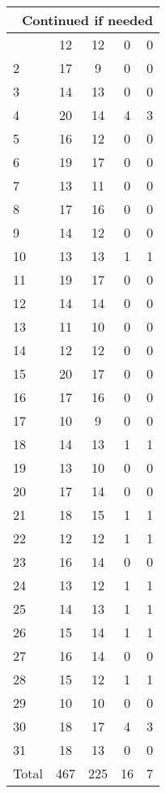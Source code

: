\begin{center}
\begin{longtable}{l|c|c|c|c}
\hline \multicolumn{5}{|r|}{{Continued if needed}} \\ \hline
\endfoot 
1 & 12 & 12 & 0 & 0\\ \hline
2 & 17 & 9 & 0 & 0\\ \hline
3 & 14 & 13 & 0 & 0\\ \hline
4 & 20 & 14 & 4 & 3\\ \hline
5 & 16 & 12 & 0 & 0\\ \hline
6 & 19 & 17 & 0 & 0\\ \hline
7 & 13 & 11 & 0 & 0\\ \hline
8 & 17 & 16 & 0 & 0\\ \hline
9 & 14 & 12 & 0 & 0\\ \hline
10 & 13 & 13 & 1 & 1\\ \hline
11 & 19 & 17 & 0 & 0\\ \hline
12 & 14 & 14 & 0 & 0\\ \hline
13 & 11 & 10 & 0 & 0\\ \hline
14 & 12 & 12 & 0 & 0\\ \hline
15 & 20 & 17 & 0 & 0\\ \hline
16 & 17 & 16 & 0 & 0\\ \hline
17 & 10 & 9 & 0 & 0\\ \hline
18 & 14 & 13 & 1 & 1\\ \hline
19 & 13 & 10 & 0 & 0\\ \hline
20 & 17 & 14 & 0 & 0\\ \hline
21 & 18 & 15 & 1 & 1\\ \hline
22 & 12 & 12 & 1 & 1\\ \hline
23 & 16 & 14 & 0 & 0\\ \hline
24 & 13 & 12 & 1 & 1\\ \hline
25 & 14 & 13 & 1 & 1\\ \hline
26 & 15 & 14 & 1 & 1\\ \hline
27 & 16 & 14 & 0 & 0\\ \hline
28 & 15 & 12 & 1 & 1\\ \hline
29 & 10 & 10 & 0 & 0\\ \hline
30 & 18 & 17 & 4 & 3\\ \hline
31 & 18 & 13 & 0 & 0\\ \hline
\hline \hline
Total & 467 & 225 & 16 & 7




\end{longtable}
\end{center}



